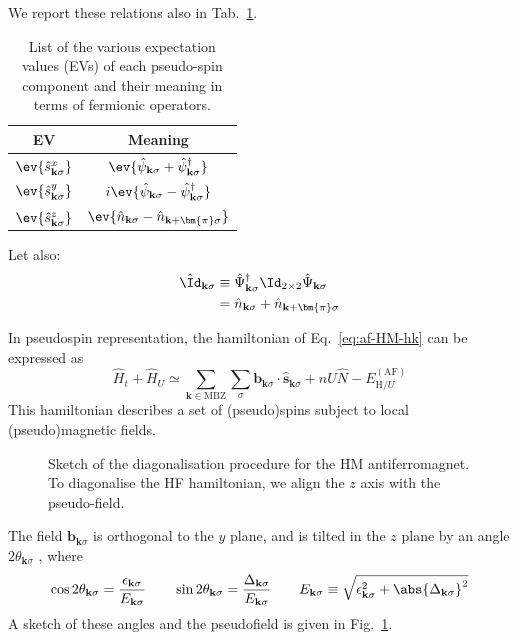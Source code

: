 We report these relations also in Tab.~\ref{tab:af-pseudo-spin-map}.
%
\begin{table}
	\centering
	\begin{tabular}{c c }
		\textbf{EV} & \textbf{Meaning} \\
		\midrule
		$\ev{\hat s_{\mathbf{k}\sigma}^x}$ & $\ev{
			\hat \psi_{\mathbf{k}\sigma}
			+ \hat \psi_{\mathbf{k}\sigma}^\dagger
		}$ \\[0.7em]
		$\ev{\hat s_{\mathbf{k}\sigma}^y}$ & $i \ev{
			\hat \psi_{\mathbf{k}\sigma}
			- \hat \psi_{\mathbf{k}\sigma}^\dagger
		}$ \\[0.7em]
		$\ev{\hat s_{\mathbf{k}\sigma}^z}$ & $\ev{
			\hat n_{\mathbf{k}\sigma}
			- \hat n_{\mathbf{k}+\bm{\pi}\sigma}
		}$ \\
		\midrule
	\end{tabular}
	\caption{List of the various expectation values (EVs) of each pseudo-spin component and their meaning in terms of fermionic operators.}
	\label{tab:af-pseudo-spin-map}
\end{table}
%
Let also:
\begin{align}
	\hat \Id_{\mathbf{k}\sigma} &\equiv \hat \Psi_{\mathbf{k}\sigma}^\dagger \Id_{2\times2} \hat \Psi_{\mathbf{k}\sigma} \nonumber \\
	&= \hat n_{\mathbf{k}\sigma} + \hat n_{\mathbf{k}+\bm{\pi}\sigma} \label{eq:af-hm-id-def}
\end{align}

In pseudospin representation, the hamiltonian of Eq.~\eqref{eq:af-HM-hk} can be expressed as
\begin{equation}\label{eq:af-hm-spin-h}
	\hat H_t + \hat H_U \simeq \sum_{\mathbf{k} \in \mathrm{MBZ}} \sum_\sigma \mathbf{b}_{\mathbf{k}\sigma} \cdot \hat{\mathbf{s}}_{\mathbf{k}\sigma} + nU \hat N - E_{\mathrm{H}/U}^{(\mathrm{AF})}
\end{equation}
This hamiltonian describes a set of (pseudo)spins subject to local (pseudo)magnetic fields. 
%
\begin{figure}
	\centering
	
	\caption{Sketch of the diagonalisation procedure for the HM antiferromagnet. To diagonalise the HF hamiltonian, we align the $z$ axis with the pseudo-field.}
	\label{fig:pseudo-magnetic-field-hm}
\end{figure}
%
The field $\mathbf{b}_{\mathbf{k}\sigma}$ is orthogonal to the $y$ plane, and is tilted in the $z$ plane by an angle $2\theta_{\mathbf{k}\sigma}$ , where
\[
	\cos 2\theta_{\mathbf{k}\sigma} = \frac{\epsilon_{\mathbf{k}\sigma}}{E_{\mathbf{k}\sigma}}
	\qquad
	\sin 2\theta_{\mathbf{k}\sigma} = \frac{\Delta_{\mathbf{k}\sigma}}{E_{\mathbf{k}\sigma}}
	\qquad
	E_{\mathbf{k}\sigma} \equiv 	\sqrt{\epsilon_{\mathbf{k}\sigma}^2 + \abs{\Delta_{\mathbf{k}\sigma}}^2}
\]
A sketch of these angles and the pseudofield is given in Fig.~\ref{fig:pseudo-magnetic-field-hm}.

